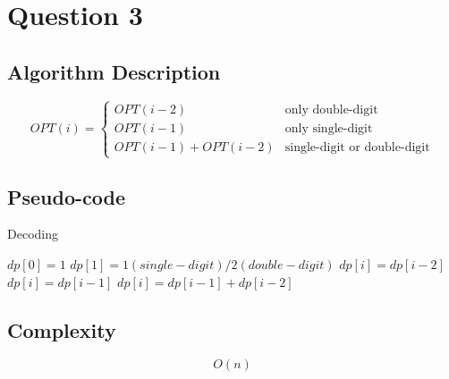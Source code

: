 \section{Question 3}
\subsection{Algorithm Description}
$$OPT(i)=
	\begin{cases}
		OPT(i-2)          & \text{only double-digit} \\
		OPT(i-1)          & \text{only single-digit} \\
		OPT(i-1)+OPT(i-2) & \text{single-digit or double-digit}
	\end{cases}$$
\subsection{Pseudo-code}

\begin{breakablealgorithm}
	\caption{Decoding}
	\begin{algorithmic}[1] %
		\State $dp[0]=1$
		\State $dp[1]=1(single-digit)/2(double-digit)$
		\State $dp[i]=dp[i-2]$
		\State $dp[i]=dp[i-1]$
		\Else
		\State $dp[i]=dp[i-1]+dp[i-2]$
		\EndIf
		\EndFor
		\State {}
		\EndFunction
	\end{algorithmic}
\end{breakablealgorithm}

\subsection{Complexity}
$$O(n)$$